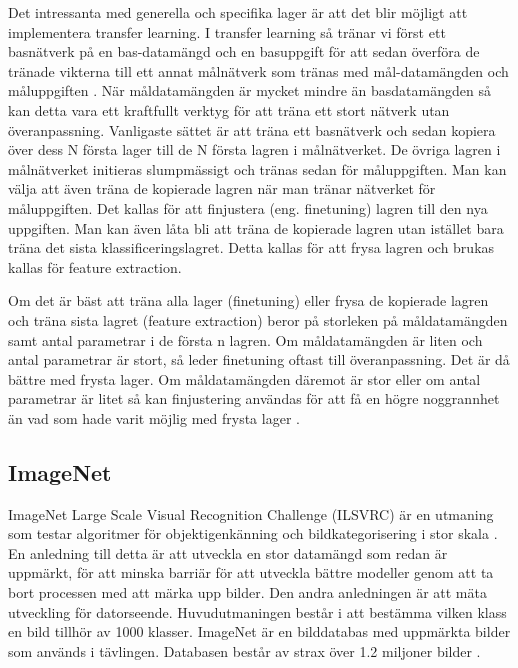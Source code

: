 \documentclass[]{kththesis}
\begin{document}
Det intressanta med generella och specifika lager är att det blir möjligt att implementera transfer learning. I transfer learning så tränar vi först ett basnätverk på en bas-datamängd och en basuppgift för att sedan överföra de tränade vikterna till ett annat målnätverk som tränas med mål-datamängden och måluppgiften \parencite{yosinski2014transferable}. När måldatamängden är mycket mindre än basdatamängden så kan detta vara ett kraftfullt verktyg för att träna ett stort nätverk utan överanpassning. Vanligaste sättet är att träna ett basnätverk och sedan kopiera över dess N första lager till de N första lagren i målnätverket. De övriga lagren i målnätverket initieras slumpmässigt och tränas sedan för måluppgiften. Man kan välja att även träna de kopierade lagren när man tränar nätverket för måluppgiften. Det kallas för att finjustera (eng. finetuning) lagren till den nya uppgiften. Man kan även låta bli att träna de kopierade lagren utan istället bara träna det sista klassificeringslagret. Detta kallas för att frysa lagren och brukas kallas för feature extraction.

Om det är bäst att träna alla lager (finetuning) eller frysa de kopierade lagren och träna sista lagret (feature extraction) beror på storleken på måldatamängden samt antal parametrar i de första n lagren. Om måldatamängden är liten och antal parametrar är stort, så leder finetuning oftast till överanpassning. Det är då bättre med frysta lager. Om måldatamängden däremot är stor eller om antal parametrar är litet så kan finjustering användas för att få en högre noggrannhet än vad som hade varit möjlig med frysta lager \parencite{yosinski2014transferable}. 

\subsection{ImageNet}
ImageNet Large Scale Visual Recognition Challenge (ILSVRC) är en utmaning som testar algoritmer för objektigenkänning och bildkategorisering i stor skala \parencite{ILSVRC15}. En anledning till detta är att utveckla en stor datamängd som redan är uppmärkt, för att minska barriär för att utveckla bättre modeller genom att ta bort processen med att märka upp bilder. Den andra anledningen är att mäta utveckling för datorseende. Huvudutmaningen består i att bestämma vilken klass en bild tillhör av 1000 klasser. ImageNet är en bilddatabas med uppmärkta bilder som används i tävlingen. Databasen består av strax över 1.2 miljoner bilder \parencite{huh2016makes}.
\end{document}
